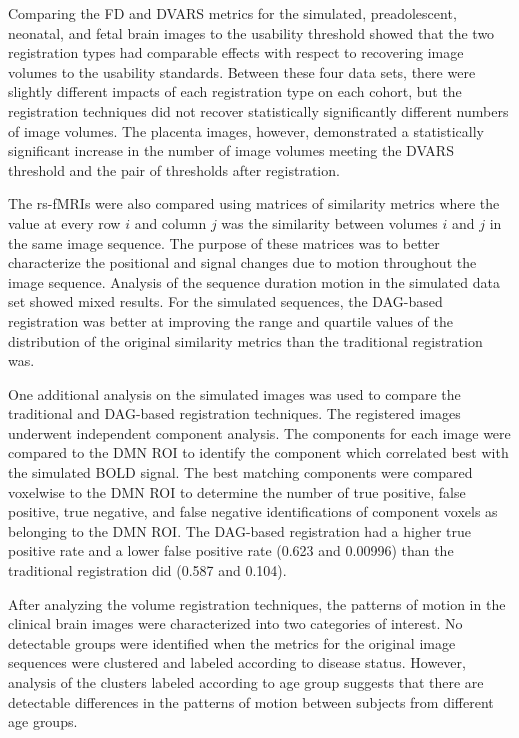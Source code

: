 Comparing the FD and DVARS metrics for the simulated, preadolescent, neonatal, and fetal brain images to the usability threshold showed that the two registration types had comparable effects with respect to recovering image volumes to the usability standards. Between these four data sets, there were slightly different impacts of each registration type on each cohort, but the registration techniques did not recover statistically significantly different numbers of image volumes. The placenta images, however, demonstrated a statistically significant increase in the number of image volumes meeting the DVARS threshold and the pair of thresholds after registration.

The rs-fMRIs were also compared using matrices of similarity metrics where the value at every row $i$ and column $j$ was the similarity between volumes $i$ and $j$ in the same image sequence. The purpose of these matrices was to better characterize the positional and signal changes due to motion throughout the image sequence. Analysis of the sequence duration motion in the simulated data set showed mixed results. For the simulated sequences, the DAG-based registration was better at improving the range and quartile values of the distribution of the original similarity metrics than the traditional registration was.

One additional analysis on the simulated images was used to compare the traditional and DAG-based registration techniques. The registered images underwent independent component analysis. The components for each image were compared to the DMN ROI to identify the component which correlated best with the simulated BOLD signal. The best matching components were compared voxelwise to the DMN ROI to determine the number of true positive, false positive, true negative, and false negative identifications of component voxels as belonging to the DMN ROI. The DAG-based registration had a higher true positive rate and a lower false positive rate (0.623 and 0.00996) than the traditional registration did (0.587 and 0.104).

After analyzing the volume registration techniques, the patterns of motion in the clinical brain images were characterized into two categories of interest. No detectable groups were identified when the metrics for the original image sequences were clustered and labeled according to disease status. However, analysis of the clusters labeled according to age group suggests that there are detectable differences in the patterns of motion between subjects from different age groups.

